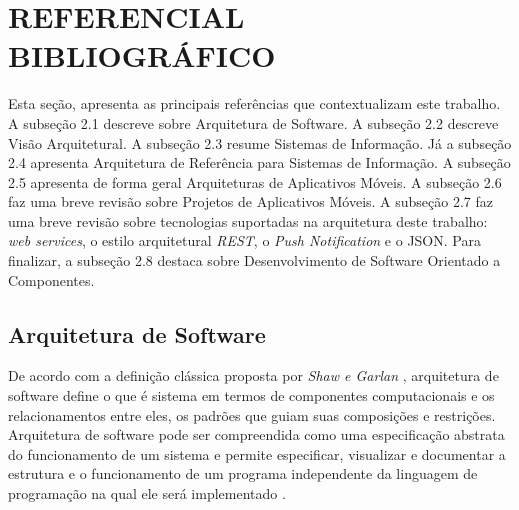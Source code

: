 
\section{REFERENCIAL BIBLIOGRÁFICO}
Esta seção, apresenta as principais referências que contextualizam este trabalho. A subseção 2.1 descreve sobre Arquitetura de Software. A subseção 2.2 descreve Visão Arquitetural. A subseção 2.3 resume Sistemas de Informação. Já a subseção 2.4 apresenta Arquitetura de Referência para Sistemas de Informação. A subseção 2.5 apresenta de forma geral Arquiteturas de Aplicativos Móveis. A subseção 2.6 faz uma breve revisão sobre Projetos de Aplicativos Móveis. A subseção 2.7 faz uma breve revisão sobre tecnologias suportadas na arquitetura deste trabalho: \textit{web services}, o estilo arquitetural \textit{REST}, o \textit{Push Notification} e o JSON. Para finalizar, a subseção 2.8 destaca sobre Desenvolvimento de Software Orientado a Componentes.


\subsection{Arquitetura de Software}
De acordo com a definição clássica proposta por \textit{Shaw e Garlan} \cite{shaw_and_garlan}, arquitetura de software define o que é sistema em termos de componentes computacionais e os relacionamentos entre eles, os padrões que guiam suas composições e restrições. Arquitetura de software pode ser compreendida como uma especificação abstrata do funcionamento de um sistema e permite especificar, visualizar e documentar a estrutura e o funcionamento de um programa independente da linguagem de programação na qual ele será implementado \cite{jair_Cavalcanti_leite}.\par

